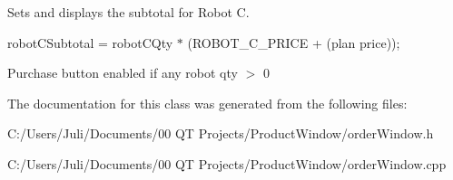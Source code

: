 Sets and displays the subtotal for Robot C. 

robot\+C\+Subtotal = robot\+C\+Qty $\ast$ (R\+O\+B\+O\+T\+\_\+\+C\+\_\+\+P\+R\+I\+CE + (plan price));

Purchase button enabled if any robot qty $>$ 0 

The documentation for this class was generated from the following files\+:\begin{DoxyCompactItemize}
\item 
C\+:/\+Users/\+Juli/\+Documents/00 Q\+T Projects/\+Product\+Window/order\+Window.\+h\item 
C\+:/\+Users/\+Juli/\+Documents/00 Q\+T Projects/\+Product\+Window/order\+Window.\+cpp\end{DoxyCompactItemize}
